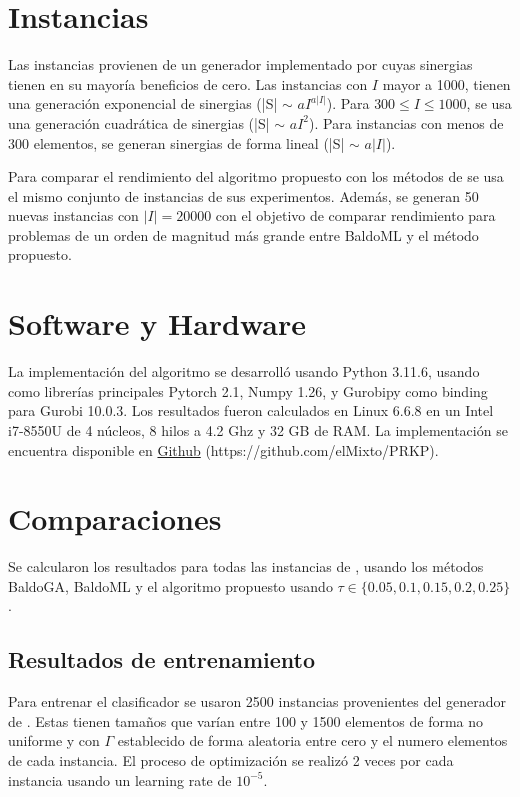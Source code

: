 \documentclass[spanish, a4paper, 12pt, openany,final]{book}
\begin{document}
\section{Instancias}

Las instancias provienen de un generador implementado por \cite{baldo_polynomial_2023} cuyas sinergias tienen en su mayoría beneficios de cero. Las instancias con $I$ mayor a 1000, tienen una generación exponencial de sinergias (|S| $\sim$ $aI^{a|I|}$). Para $300 \le I \le 1000$, se usa una generación cuadrática de sinergias (|S| $\sim$ $aI^{2}$). Para instancias con menos de 300 elementos, se generan sinergias de forma lineal (|S| $\sim$ $a|I|$).

Para comparar el rendimiento del algoritmo propuesto con los métodos de \cite{baldo_polynomial_2023} se usa el mismo conjunto de instancias de sus experimentos. Además, se generan 50 nuevas instancias con $|I| = 20000$ con el objetivo de comparar rendimiento para problemas de un orden de magnitud más grande entre BaldoML y el método propuesto.

\section{Software y Hardware}

La implementación del algoritmo se desarrolló usando Python 3.11.6, usando como librerías principales Pytorch 2.1, Numpy 1.26, y Gurobipy como binding para Gurobi 10.0.3. Los resultados fueron calculados en Linux 6.6.8 en un Intel i7-8550U de 4 núcleos, 8 hilos a 4.2 Ghz y 32 GB de RAM. La implementación se encuentra disponible en \href{https://github.com/elMixto/PRKP.git}{Github} (https://github.com/elMixto/PRKP).

\section{Comparaciones}


Se calcularon los resultados para todas las instancias de \cite{baldo_polynomial_2023}, usando los métodos BaldoGA, BaldoML y el algoritmo propuesto usando $\tau \in \{0.05,0.1,0.15,0.2,0.25 \}$.


\subsection*{Resultados de entrenamiento}

Para entrenar el clasificador se usaron 2500 instancias provenientes del generador de \cite{baldo_polynomial_2023}. Estas tienen tamaños que varían entre 100 y 1500 elementos de forma no uniforme y con $\Gamma$ establecido de forma aleatoria entre cero y el numero elementos de cada instancia. El proceso de optimización se realizó 2 veces por cada instancia usando un learning rate de $10^{-5}$.
\end{document}
